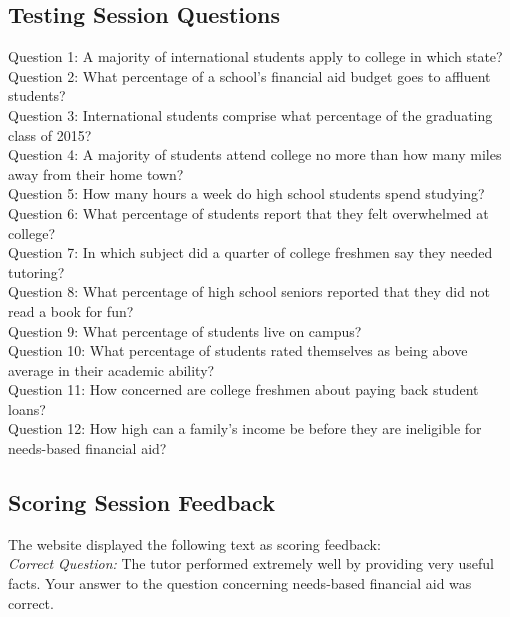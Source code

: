 \documentclass{sig-alternate-05-2015}
\begin{document}
\subsection{Testing Session Questions}
\noindent Question 1: A majority of international students apply to college in which state?\\[\baselineskip]
\noindent Question 2: What percentage of a school's financial aid budget goes to affluent students?\\[\baselineskip]
\noindent Question 3: International students comprise what percentage of the graduating class of 2015?\\[\baselineskip]
\noindent Question 4: A majority of students attend college no more than how many miles away from their home town?\\[\baselineskip]
\noindent Question 5: How many hours a week do high school students spend studying?\\[\baselineskip]
\noindent Question 6: What percentage of students report that they felt overwhelmed at college?\\[\baselineskip]
\noindent Question 7: In which subject did a quarter of college freshmen say they needed tutoring?\\[\baselineskip]
\noindent Question 8: What percentage of high school seniors reported that they did not read a book for fun?\\[\baselineskip]
\noindent Question 9: What percentage of students live on campus?\\[\baselineskip]
\noindent Question 10: What percentage of students rated themselves as being above average in their academic ability?\\[\baselineskip]
\noindent Question 11: How concerned are college freshmen about paying back student loans?\\[\baselineskip]
\noindent Question 12: How high can a family's income be before they are ineligible for needs-based financial aid?\\

\subsection{Scoring Session Feedback}
\noindent The website displayed the following text as scoring feedback:\\

\noindent \emph{Correct Question:} The tutor performed extremely well by providing very useful facts. Your answer to the question concerning needs-based financial aid was correct.\\
\end{document}
